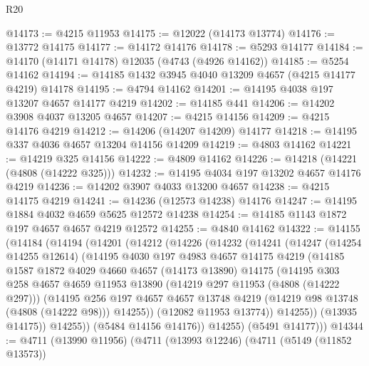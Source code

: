 \begin{lexlean}{R20}
\begin{coremodule}
@14173 := @4215 @11953
@14175 := @12022 (@14173 @13774)
@14176 := @13772 @14175
@14177 := @14172 @14176
@14178 := @5293 @14177
@14184 := @14170 (@14171 @14178) @12035 (@4743 (@4926 @14162))
@14185 := @5254 @14162
@14194 := @14185 @1432 @3945 @4040 @13209 @4657 (@4215 @14177 @4219) @14178
@14195 := @4794 @14162
@14201 := @14195 @4038 @197 @13207 @4657 @14177 @4219
@14202 := @14185 @441
@14206 := @14202 @3908 @4037 @13205 @4657
@14207 := @4215 @14156
@14209 := @4215 @14176 @4219
@14212 := @14206 (@14207 @14209) @14177
@14218 := @14195 @337 @4036 @4657 @13204 @14156 @14209
@14219 := @4803 @14162
@14221 := @14219 @325 @14156
@14222 := @4809 @14162
@14226 := @14218 (@14221 (@4808 (@14222 @325)))
@14232 := @14195 @4034 @197 @13202 @4657 @14176 @4219
@14236 := @14202 @3907 @4033 @13200 @4657
@14238 := @4215 @14175 @4219
@14241 := @14236 (@12573 @14238) @14176
@14247 := @14195 @1884 @4032 @4659 @5625 @12572 @14238
@14254 := @14185 @1143 @1872 @197 @4657 @4657 @4219 @12572
@14255 := @4840 @14162
@14322 := @14155
    (@14184
      (@14194
        (@14201
          (@14212
            (@14226
              (@14232
                (@14241
                  (@14247
                    (@14254 @14255 @12614)
                    (@14195
                      @4030
                      @197
                      @4983
                      @4657
                      @14175
                      @4219
                      (@14185
                        @1587
                        @1872
                        @4029
                        @4660
                        @4657
                        (@14173 @13890)
                        @14175
                        (@14195
                          @303
                          @258
                          @4657
                          @4659
                          @11953
                          @13890
                          (@14219 @297 @11953 (@4808 (@14222 @297)))
                          (@14195
                            @256
                            @197
                            @4657
                            @4657
                            @13748
                            @4219
                            (@14219 @98 @13748 (@4808 (@14222 @98)))
                            @14255))
                        (@12082 @11953 @13774))
                      @14255))
                  (@13935 @14175))
                @14255))
            (@5484 @14156 @14176))
          @14255)
        (@5491 @14177)))
@14344 := @4711
    (@13990 @11956)
    (@4711
      (@13993 @12246)
      (@4711
        (@5149 (@11852 @13573))

\end{coremodule}
\end{lexlean}
